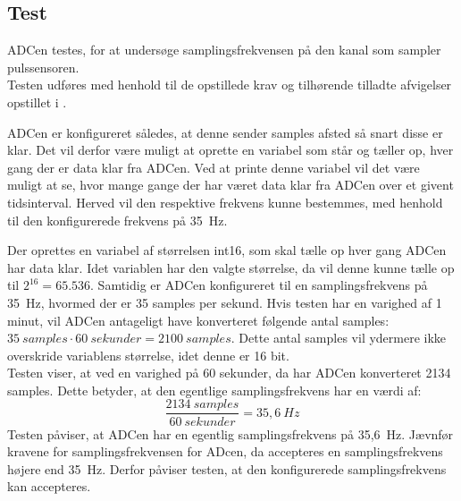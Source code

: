 \subsection{Test}
ADCen testes, for at undersøge samplingsfrekvensen på den kanal som sampler pulssensoren. \\
Testen udføres med henhold til de opstillede krav og tilhørende tilladte afvigelser opstillet i .

ADCen er konfigureret således, at denne sender samples afsted så snart disse er klar. Det vil derfor være muligt at oprette en variabel som står og tæller op, hver gang der er data klar fra ADCen. Ved at printe denne variabel vil det være muligt at se, hvor mange gange der har været data klar fra ADCen over et givent tidsinterval. Herved vil den respektive frekvens kunne bestemmes, med henhold til den konfigurerede frekvens på 35~Hz. 

Der oprettes en variabel af størrelsen int16, som skal tælle op hver gang ADCen har data klar. Idet variablen har den valgte størrelse, da vil denne kunne tælle op til $2^16 = 65.536$. Samtidig er ADCen konfigureret til en samplingsfrekvens på 35~Hz, hvormed der er 35 samples per sekund. Hvis testen har en varighed af 1 minut, vil ADCen antageligt have konverteret følgende antal samples: $35~samples \cdot 60~sekunder = 2100~samples$. Dette antal samples vil ydermere ikke overskride variablens størrelse, idet denne er 16 bit. \\
Testen viser, at ved en varighed på 60 sekunder, da har ADCen konverteret 2134 samples. Dette betyder, at den egentlige samplingsfrekvens har en værdi af:
\begin{equation}
\frac{2134~samples}{60~sekunder} = 35,6~Hz 
\end{equation}
Testen påviser, at ADCen har en egentlig samplingsfrekvens på 35,6~Hz. Jævnfør kravene for samplingsfrekvensen for ADcen, da accepteres en samplingsfrekvens højere end 35~Hz. Derfor påviser testen, at den konfigurerede samplingsfrekvens kan accepteres. 

